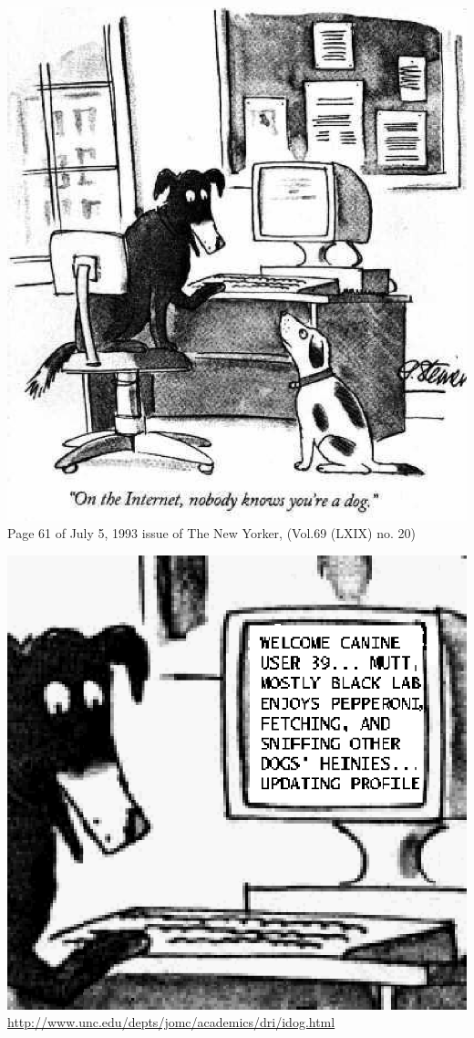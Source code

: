\documentclass[a4paper,landscape,headrule,footrule,xetex]{foils}
\begin{document}
\begin{center}
  \includegraphics[height=0.9\textheight]{../pics/idog.eps}
\\ Page 61 of July 5, 1993 issue of The New Yorker, (Vol.69 (LXIX) no. 20)
\end{center}
\newpage
\begin{center}
  \includegraphics[height=0.8\textheight]{../pics/dog3.eps}
\url{http://www.unc.edu/depts/jomc/academics/dri/idog.html}
\end{center}
\end{document}

